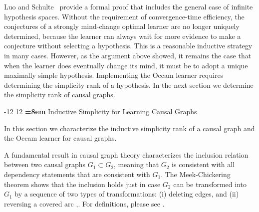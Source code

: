 \documentclass{elsarticle}%
\makeatletter
\renewcommand\section{\@startsection {section}{1}{\z@}%
  {-12\p@ \@plus -4\p@ \@minus -4\p@}%
                       {12\p@ \@plus 4\p@ \@minus 4\p@}%
                                   {\normalfont\large\bfseries\boldmath
                                   \rightskip=\z@ \@plus 8em\pretolerance=10000 }}
\newcommand{\G}{G}
\makeatother
\begin{document}
Luo and Schulte~\cite{luo06:_mind_chang_effic_learn} provide a formal proof that includes the general case of infinite hypothesis spaces. Without the requirement of convergence-time efficiency, the conjectures of a strongly mind-change optimal learner are no longer uniquely determined, because the learner can always wait for more evidence to make a conjecture without selecting a hypothesis. This is a reasonable inductive strategy in many cases. However, as the argument above showed, it remains the case that when the learner does eventually change its mind, it must be to adopt a unique maximally simple hypothesis. Implementing the Occam learner requires determining the simplicity rank of a hypothesis. In the next section we determine the simplicity rank of causal graphs. 

\section{Inductive Simplicity for Learning Causal Graphs}
\label{sec:graph-simplicity}

In this section we characterize the inductive simplicity rank of a causal graph and the Occam learner for causal graphs. 

A fundamental result in causal graph theory characterizes the inclusion relation between two causal graphs $\G_{1} \subset \G_{2}$, meaning that $\G_{2}$ is consistent with all dependency statements that are consistent with $\G_{1}$. The Meek-Chickering theorem shows that the inclusion holds just in case $\G_{2}$ can be transformed into $\G_{1}$ by a sequence of two types of transformations: (i) deleting edges, and (ii) reversing a covered arc \cite{meek97:_graph_modeln},\cite[Thm.4]{Chickering2003}. For definitions, please see \cite{Schulte2010}. 
\end{document}
